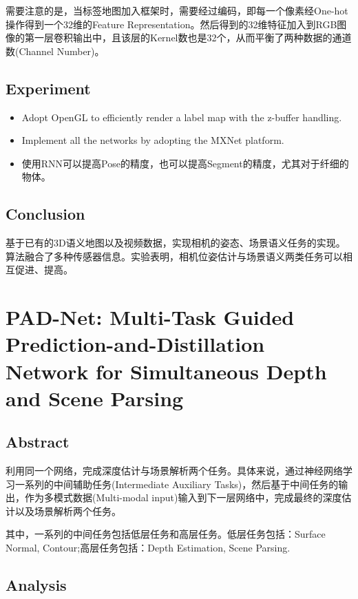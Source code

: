 需要注意的是，当标签地图加入框架时，需要经过编码，即每一个像素经One-hot操作得到一个32维的Feature Representation。然后得到的32维特征加入到RGB图像的第一层卷积输出中，且该层的Kernel数也是32个，从而平衡了两种数据的通道数(Channel Number)。

\subsection{Experiment}

\begin{itemize}
\item Adopt OpenGL to efficiently render a label map with the z-buffer handling. 

\item Implement all the networks by adopting the MXNet platform.

\item 使用RNN可以提高Pose的精度，也可以提高Segment的精度，尤其对于纤细的物体。

\end{itemize}

\subsection{Conclusion}

基于已有的3D语义地图以及视频数据，实现相机的姿态、场景语义任务的实现。算法融合了多种传感器信息。实验表明，相机位姿估计与场景语义两类任务可以相互促进、提高。

\section{PAD-Net: Multi-Task Guided Prediction-and-Distillation Network for Simultaneous Depth and Scene Parsing \cite{Xu2018PADNet}}

\subsection{Abstract}

利用同一个网络，完成深度估计与场景解析两个任务。具体来说，通过神经网络学习一系列的中间辅助任务(Intermediate Auxiliary Tasks)，然后基于中间任务的输出，作为多模式数据(Multi-modal  input)输入到下一层网络中，完成最终的深度估计以及场景解析两个任务。

其中，一系列的中间任务包括低层任务和高层任务。低层任务包括：Surface Normal, Contour;高层任务包括：Depth Estimation, Scene Parsing.

\subsection{Analysis}

